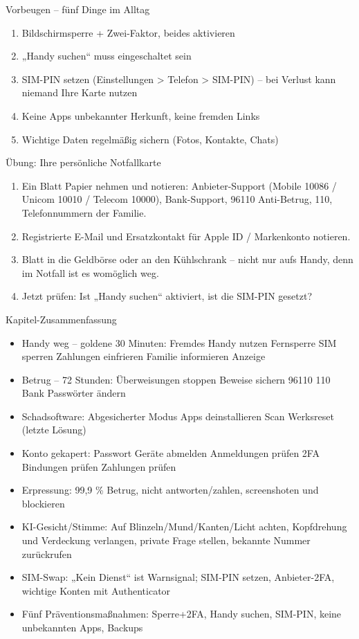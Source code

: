 \begin{tcbwarn}{Vorbeugen – fünf Dinge im Alltag}
\begin{enumerate}
  \item Bildschirmsperre + Zwei-Faktor, beides aktivieren
  \item „Handy suchen“ muss eingeschaltet sein
  \item SIM-PIN setzen (Einstellungen > Telefon > SIM-PIN) – bei Verlust kann niemand Ihre Karte nutzen
  \item Keine Apps unbekannter Herkunft, keine fremden Links
  \item Wichtige Daten regelmäßig sichern (Fotos, Kontakte, Chats)
\end{enumerate}

\end{tcbwarn}

\begin{tcbpractice}{Übung: Ihre persönliche Notfallkarte}
\begin{enumerate}
  \item Ein Blatt Papier nehmen und notieren: Anbieter-Support (Mobile 10086 / Unicom 10010 / Telecom 10000), Bank-Support, 96110 Anti-Betrug, 110, Telefonnummern der Familie.
  \item Registrierte E-Mail und Ersatzkontakt für Apple ID / Markenkonto notieren.
  \item Blatt in die Geldbörse oder an den Kühlschrank – nicht nur aufs Handy, denn im Notfall ist es womöglich weg.
  \item Jetzt prüfen: Ist „Handy suchen“ aktiviert, ist die SIM-PIN gesetzt?
\end{enumerate}

\end{tcbpractice}

\begin{tcbsummary}{Kapitel-Zusammenfassung}
\begin{itemize}
  \item Handy weg – goldene 30 Minuten: Fremdes Handy nutzen Fernsperre SIM sperren Zahlungen einfrieren Familie informieren Anzeige
  \item Betrug – 72 Stunden: Überweisungen stoppen Beweise sichern 96110 110 Bank Passwörter ändern
  \item Schadsoftware: Abgesicherter Modus Apps deinstallieren Scan Werksreset (letzte Lösung)
  \item Konto gekapert: Passwort Geräte abmelden Anmeldungen prüfen 2FA Bindungen prüfen Zahlungen prüfen
  \item Erpressung: 99,9 \% Betrug, nicht antworten/zahlen, screenshoten und blockieren
  \item KI-Gesicht/Stimme: Auf Blinzeln/Mund/Kanten/Licht achten, Kopfdrehung und Verdeckung verlangen, private Frage stellen, bekannte Nummer zurückrufen
  \item SIM-Swap: „Kein Dienst“ ist Warnsignal; SIM-PIN setzen, Anbieter-2FA, wichtige Konten mit Authenticator
  \item Fünf Präventionsmaßnahmen: Sperre+2FA, Handy suchen, SIM-PIN, keine unbekannten Apps, Backups
\end{itemize}

\end{tcbsummary}
